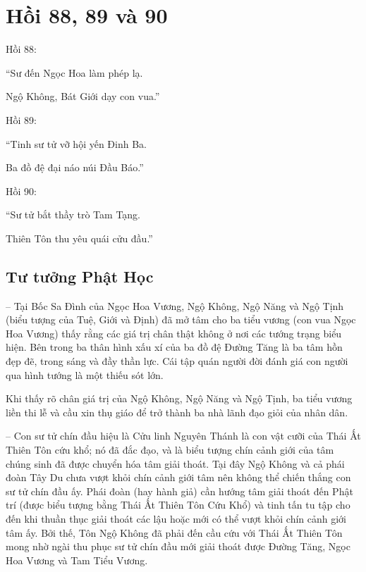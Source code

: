 \chapter{Hồi 88, 89 và 90} %
\label{cha:hoi_88_89_90}

Hồi 88:

\begin{itshape}
``Sư đến Ngọc Hoa làm phép lạ.

Ngộ Không, Bát Giới dạy con vua.''
\end{itshape}

Hồi 89:

\begin{itshape}
``Tinh sư tử vỡ hội yến Đinh Ba.

Ba đồ đệ đại náo núi Đầu Báo.''
\end{itshape}

Hồi 90:

\begin{itshape}
``Sư tử bắt thầy trò Tam Tạng.

Thiên Tôn thu yêu quái cửu đầu.''
\end{itshape}

\section{Tư tưởng Phật Học} %
\label{sec:88_89_90_phat_hoc}

-- Tại Bốc Sa Đình của Ngọc Hoa Vương, Ngộ Không, Ngộ Năng và Ngộ Tịnh (biểu tượng của Tuệ, Giới và Định) đã mở tâm cho ba tiểu vương (con vua Ngọc Hoa Vương) thấy rằng các giá trị chân thật không ở nơi các tướng trạng biểu hiện. Bên trong ba thân hình xấu xí của ba đồ đệ Đường Tăng là ba tâm hồn đẹp đẽ, trong sáng và đầy thần lực. Cái tập quán người đời đánh giá con người qua hình tướng là một thiếu sót lớn.

Khi thấy rõ chân giá trị của Ngộ Không, Ngộ Năng và Ngộ Tịnh, ba tiểu vương liền thi lễ và cầu xin thụ giáo để trở thành ba nhà lãnh đạo giỏi của nhân dân.

-- Con sư tử chín đầu hiệu là Cửu linh Nguyên Thánh là con vật cưỡi của Thái Ất Thiên Tôn cứu khổ; nó đã đắc đạo, và là biểu tượng chín cảnh giới của tâm chúng sinh đã được chuyển hóa tâm giải thoát. Tại đây Ngộ Không và cả phái đoàn Tây Du chưa vượt khỏi chín cảnh giới tâm nên không thể chiến thắng con sư tử chín đầu ấy. Phái đoàn (hay hành giả) cần hướng tâm giải thoát đến Phật trí (được biểu tượng bằng Thái Ất Thiên Tôn Cứu Khổ) và tinh tấn tu tập cho đến khi thuần thục giải thoát các lậu hoặc mới có thể vượt khỏi chín cảnh giới tâm ấy. Bởi thế, Tôn Ngộ Không đã phải đến cầu cứu với Thái Ất Thiên Tôn mong nhờ ngài thu phục sư tử chín đầu mới giải thoát được Đường Tăng, Ngọc Hoa Vương và Tam Tiểu Vương.

